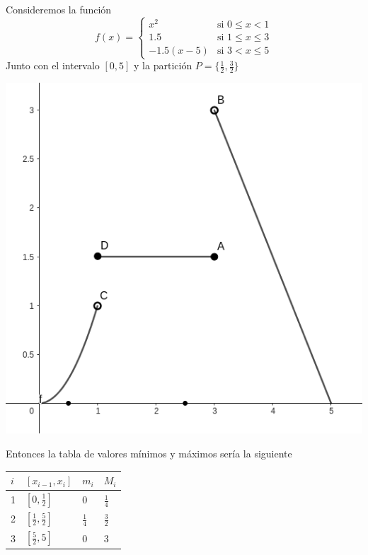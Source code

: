 \documentclass{report}
\begin{document}

    \begin{Example}
        Consideremos la función $$f(x) =
        \begin{cases}
        x^2 & \text{si } 0 \leq x < 1 \\
        1.5 & \text{si } 1 \leq x \leq 3 \\
        -1.5(x-5) & \text{si } 3 < x \leq 5
        \end{cases}$$
        Junto con el intervalo $[0, 5]$ y la partición $P = \{\frac{1}{2}, \frac{3}{2}\}$

        \begin{center}
            \includegraphics[width=.5\textwidth]{images/minmax.png}
        \end{center}

        Entonces la tabla de valores mínimos y máximos sería la siguiente

        \begin{center}
            \begin{table}[h]
                \begin{tabular}{l|l|l|l}
                    $i$ & $[x_{i-1}, x_i]$             & $m_i$         & $M_i$         \\ \hline
                    1   & $[0, \frac{1}{2}]$           & 0             & $\frac{1}{4}$ \\
                    2   & $[\frac{1}{2}, \frac{5}{2}]$ & $\frac{1}{4}$ & $\frac{3}{2}$ \\
                    3   & $[\frac{5}{2}, 5]$           & 0             & 3
                \end{tabular}
            \end{table}
        \end{center}

    \end{Example}
\end{document}
